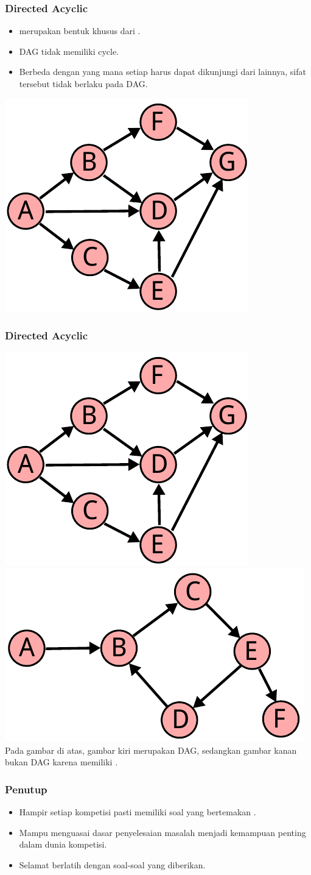 \begin{frame}
\frametitle{Directed Acyclic \fGraph}
\begin{itemize}
  \item {} merupakan bentuk khusus dari  \fgraph.
  \item DAG tidak memiliki \alert{cycle}.
  \item Berbeda dengan \ftree yang mana setiap \fnode harus dapat dikunjungi dari \fnode lainnya, sifat tersebut tidak berlaku pada DAG.
\end{itemize}
\begin{center}
  \includegraphics[width=4 cm]{asset/dag.pdf}
\end{center}
\end{frame}

\begin{frame}
\frametitle{Directed Acyclic \fGraph}
\includegraphics[width=4 cm]{asset/dag.pdf}
\hspace{\fill}
\includegraphics[width=5 cm]{asset/not-dag.pdf}
\newline\newline
Pada gambar di atas, gambar kiri merupakan DAG, sedangkan gambar kanan bukan DAG karena memiliki .
\end{frame}

\begin{frame}
\frametitle{Penutup}
\begin{itemize}
  \item Hampir setiap kompetisi pasti memiliki soal yang bertemakan \fgraph.
  \item Mampu menguasai dasar penyelesaian masalah \fgraph menjadi kemampuan penting dalam dunia kompetisi.
  \item Selamat berlatih dengan soal-soal yang diberikan.
\end{itemize}
\end{frame}


